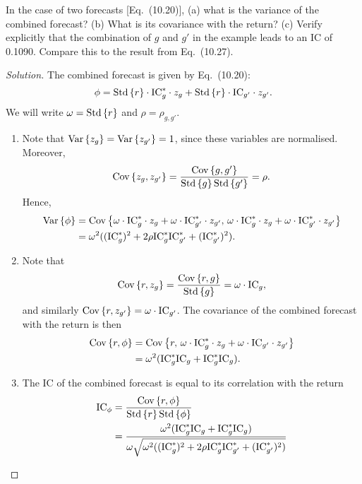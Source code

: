 \begin{problem}{10.4}
  In the case of two forecasts [Eq.\ (10.20)], (a) what is the variance of the combined forecast? (b) What is its covariance with the return? (c) Verify explicitly that the combination of $g$ and $g'$ in the example leads to an IC of 0.1090. Compare this to the result from Eq.\ (10.27).
\end{problem}

\begin{proof}[Solution]
  The combined forecast is given by Eq.\ (10.20): \[\phi = \mathrm{Std}\left\lbrace r\right\rbrace\cdot \mathrm{IC}_{g}^{\ast} \cdot z_{g} + \mathrm{Std}\left\lbrace r\right\rbrace\cdot \mathrm{IC}_{g'} \cdot z_{g'}.\] We will write $\omega = \mathrm{Std}\left\lbrace r\right\rbrace$ and $\rho = \rho_{g, g'}$.
  \begin{enumerate}[label=(\alph*)]
    \item Note that $\mathrm{Var}\left\lbrace z_{g}\right\rbrace = \mathrm{Var}\left\lbrace z_{g'}\right\rbrace = 1$, since these variables are normalised. Moreover, \[\mathrm{Cov}\left\lbrace z_{g}, z_{g'}\right\rbrace = \frac{\mathrm{Cov}\left\lbrace g, g'\right\rbrace}{\mathrm{Std}\left\lbrace g\right\rbrace\mathrm{Std}\left\lbrace g'\right\rbrace} = \rho.\] Hence,
    \begin{align*}
    \mathrm{Var}\left\lbrace\phi\right\rbrace &= \mathrm{Cov}\left\lbrace\omega \cdot \mathrm{IC}_{g}^{\ast} \cdot z_{g} + \omega \cdot \mathrm{IC}_{g'}^{\ast} \cdot z_{g'},\, \omega \cdot \mathrm{IC}_{g}^{\ast} \cdot z_{g} + \omega \cdot \mathrm{IC}_{g'}^{\ast} \cdot z_{g'}\right\rbrace\\
    &= \omega^{2}((\mathrm{IC}_{g}^{\ast})^{2} + 2\rho\mathrm{IC}_{g}^{\ast}\mathrm{IC}_{g'}^{\ast} + (\mathrm{IC}_{g'}^{\ast})^{2}).
    \end{align*}
    \item Note that \[\mathrm{Cov}\left\lbrace r, z_{g}\right\rbrace = \frac{\mathrm{Cov}\left\lbrace r, g\right\rbrace}{\mathrm{Std}\left\lbrace g\right\rbrace} = \omega \cdot \mathrm{IC}_{g},\] and similarly $\mathrm{Cov}\left\lbrace r, z_{g'}\right\rbrace = \omega \cdot \mathrm{IC}_{g'}$.  The covariance of the combined forecast with the return is then
    \begin{align*}
    \mathrm{Cov}\left\lbrace r, \phi\right\rbrace &= \mathrm{Cov}\left\lbrace r,\, \omega \cdot \mathrm{IC}_{g}^{\ast} \cdot z_{g} + \omega \cdot \mathrm{IC}_{g'} \cdot z_{g'}\right\rbrace\\
    &= \omega^{2}(\mathrm{IC}_{g}^{\ast}\mathrm{IC}_{g} + \mathrm{IC}_{g}^{\ast}\mathrm{IC}_{g}).
    \end{align*}
    \item The IC of the combined forecast is equal to its correlation with the return
	\begin{align*}
	\mathrm{IC}_{\phi} &= \frac{\cov{r, \phi}}{\std{r}\std{\phi}}\\
	&= \frac{\omega^{2}(\mathrm{IC}_{g}^{\ast}\mathrm{IC}_{g} + \mathrm{IC}_{g}^{\ast}\mathrm{IC}_{g})}{\omega \sqrt{\omega^{2}((\mathrm{IC}_{g}^{\ast})^{2} + 2\rho\mathrm{IC}_{g}^{\ast}\mathrm{IC}_{g'}^{\ast} + (\mathrm{IC}_{g'}^{\ast})^{2})}}\\

\end{align*}
\end{enumerate}
\end{proof}
